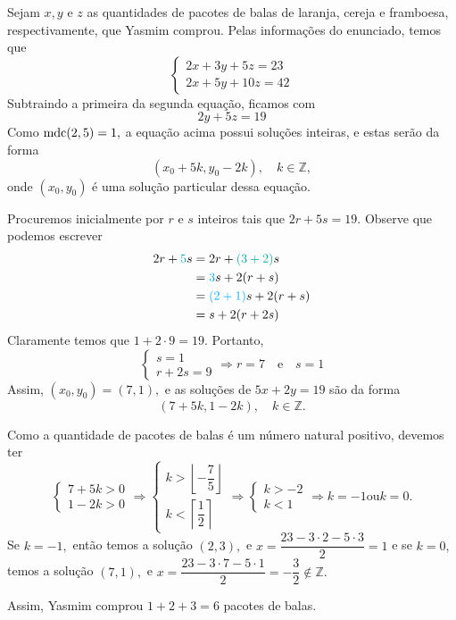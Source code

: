 \documentclass[12pt, a4paper]{article}
\newcommand{\mdc}{{\rm mdc}}
\begin{document}
\begin{solution}
Sejam $x, y$ e $z$ as quantidades de pacotes de balas de laranja, cereja e framboesa, respectivamente, que Yasmim comprou. Pelas informações do enunciado, temos que
\[
\begin{cases}
2x+3y+5z = 23 \\
2x + 5y + 10z = 42
\end{cases}
\]
Subtraindo a primeira da segunda equação, ficamos com
\[
2y + 5z = 19
\]
Como $\mdc(2,5)=1,$ a equação acima possui soluções inteiras, e estas serão da forma 
	\[
	(x_0 + 5k, y_0 - 2k), \quad k \in \mathbb{Z},
	\]
	onde $(x_0, y_0)$ é uma solução particular dessa equação. 
	
	Procuremos inicialmente por $r$ e $s$ inteiros tais que $2r + 5s = 19.$
Observe que podemos escrever
	\begin{align*}
	2r + \textcolor{Emerald}{5}s &= 2r + \textcolor{Emerald}{(3+2)}s \\&= \textcolor{Cyan}{3}s + 2(r+s) \\&= \textcolor{Cyan}{(2+1)}s + 2(r+s) \\&= s + 2(r+2s)
	\end{align*}
	Claramente temos que $1 + 2 \cdot 9 = 19.$ Portanto,
	\[
	\begin{cases}
	s = 1 \\
	r+2s = 9
	\end{cases} \Rightarrow r = 7 \quad \mbox{e} \quad s = 1
	\]
	Assim, $(x_0, y_0) = (7,1),$ e as soluções de $5x + 2y = 19$ são da forma
	\[
	(7 + 5k, 1 - 2k), \quad k \in \mathbb{Z}.
	\]

Como a quantidade de pacotes de balas é um número natural positivo, devemos ter
\[
\begin{cases}
7 + 5k > 0 \\
1 - 2k > 0
\end{cases} \Rightarrow \begin{cases}
k > \left\lfloor -\dfrac{7}{5} \right\rfloor \\
k < \left\lceil \dfrac{1}{2} \right\rceil
\end{cases} \Rightarrow \begin{cases}
k > -2 \\
k < 1
\end{cases} \Rightarrow k = -1 \mbox{ou} k = 0 .
\]
Se $k = -1,$ então temos a solução $(2, 3),$ e $x = \dfrac{23 - 3 \cdot 2 - 5 \cdot 3}{2} = 1$ e se $k = 0,$ temos a solução $(7,1),$ e $x = \dfrac{23 - 3 \cdot 7 - 5 \cdot 1}{2} = -\dfrac{3}{2} \notin \mathbb{Z}.$ 

Assim, Yasmim comprou $1+2+3 = 6$ pacotes de balas.

\end{solution}
\end{document}
